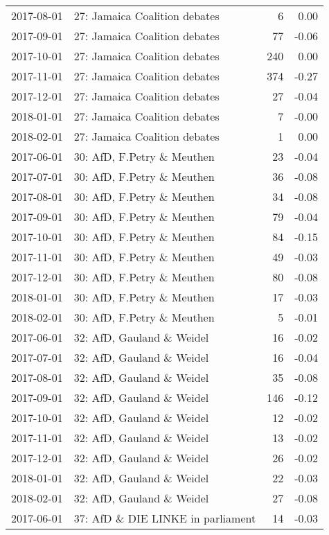 \begin{table}[ht]
\begin{tabular}{llrr}
  2017-08-01 & 27: Jamaica Coalition debates &   6 & 0.00 \\ 
  2017-09-01 & 27: Jamaica Coalition debates &  77 & -0.06 \\ 
  2017-10-01 & 27: Jamaica Coalition debates & 240 & 0.00 \\ 
  2017-11-01 & 27: Jamaica Coalition debates & 374 & -0.27 \\ 
  2017-12-01 & 27: Jamaica Coalition debates &  27 & -0.04 \\ 
  2018-01-01 & 27: Jamaica Coalition debates &   7 & -0.00 \\ 
  2018-02-01 & 27: Jamaica Coalition debates &   1 & 0.00 \\ 
  2017-06-01 & 30: AfD, F.Petry \& Meuthen &  23 & -0.04 \\ 
  2017-07-01 & 30: AfD, F.Petry \& Meuthen &  36 & -0.08 \\ 
  2017-08-01 & 30: AfD, F.Petry \& Meuthen &  34 & -0.08 \\ 
  2017-09-01 & 30: AfD, F.Petry \& Meuthen &  79 & -0.04 \\ 
  2017-10-01 & 30: AfD, F.Petry \& Meuthen &  84 & -0.15 \\ 
  2017-11-01 & 30: AfD, F.Petry \& Meuthen &  49 & -0.03 \\ 
  2017-12-01 & 30: AfD, F.Petry \& Meuthen &  80 & -0.08 \\ 
  2018-01-01 & 30: AfD, F.Petry \& Meuthen &  17 & -0.03 \\ 
  2018-02-01 & 30: AfD, F.Petry \& Meuthen &   5 & -0.01 \\ 
  2017-06-01 & 32: AfD, Gauland \& Weidel &  16 & -0.02 \\ 
  2017-07-01 & 32: AfD, Gauland \& Weidel &  16 & -0.04 \\ 
  2017-08-01 & 32: AfD, Gauland \& Weidel &  35 & -0.08 \\ 
  2017-09-01 & 32: AfD, Gauland \& Weidel & 146 & -0.12 \\ 
  2017-10-01 & 32: AfD, Gauland \& Weidel &  12 & -0.02 \\ 
  2017-11-01 & 32: AfD, Gauland \& Weidel &  13 & -0.02 \\ 
  2017-12-01 & 32: AfD, Gauland \& Weidel &  26 & -0.02 \\ 
  2018-01-01 & 32: AfD, Gauland \& Weidel &  22 & -0.03 \\ 
  2018-02-01 & 32: AfD, Gauland \& Weidel &  27 & -0.08 \\ 
  2017-06-01 & 37: AfD \& DIE LINKE in parliament &  14 & -0.03 \\ 

\end{tabular}
\end{table}
